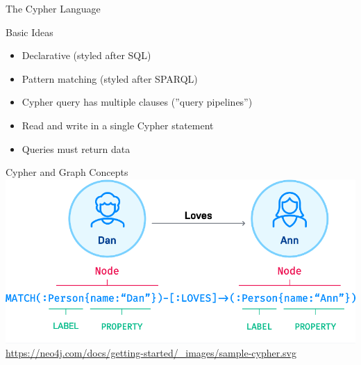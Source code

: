 \documentclass[ignorenonframetext,xcolor=x11names]{beamer}
\begin{document}
\begin{frame}{The Cypher Language}

\begin{block}{Basic Ideas}
\begin{itemize}
  \item Declarative (styled after SQL)
  \item Pattern matching (styled after SPARQL)
  \item Cypher query has multiple clauses (''query pipelines'')
  \item Read and write in a single Cypher statement
  \item Queries must return data
\end{itemize}
\end{block}
\end{frame}

\begin{frame}{Cypher and Graph Concepts}
\centering
\includegraphics[width=\textwidth]{sample-cypher.png}
\tiny{\url{https://neo4j.com/docs/getting-started/_images/sample-cypher.svg}}
\end{frame}
\end{document}
